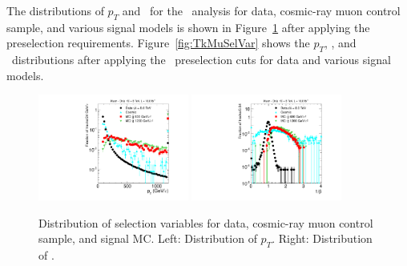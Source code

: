 The distributions of $p_T$ and \invbeta\ for the \muononly\ analysis for data, cosmic-ray muon control sample, and various signal models is 
shown in Figure~\ref{fig:MuOnlySelVar} after applying the preselection requirements. Figure~\ref{fig:TkMuSelVar} shows the $p_T$, \invbeta, and \dedx\
distributions after applying the \tktof\ preselection cuts for data and various signal models.

\begin{figure}
\centering
  \includegraphics[clip=true, trim=0.0cm 0cm 2.8cm 0cm, width=0.44\textwidth]{figures/muonly/Selection_Comp_8TeV_Cosmic_Pt_BS}
  \includegraphics[clip=true, trim=0.0cm 0cm 2.8cm 0cm, width=0.44\textwidth]{figures/muonly/Selection_Comp_8TeV_Cosmic_TOF_BS} \\
  \caption[Distribution of \invbeta\ and \pt\ in the \muononly\ analysis for data, cosmic-ray muon control sample, and signal MC]
{Distribution of selection variables for data, cosmic-ray muon control sample, and signal MC.
Left: Distribution of $p_T$. Right: Distribution of \invbeta.}
    \label{fig:MuOnlySelVar}
\end{figure}

